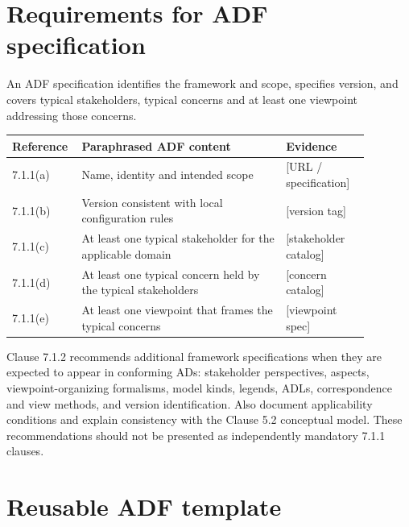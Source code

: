 \documentclass[11pt,letterpaper]{article}
\begin{document}
\section{Requirements for ADF specification}
\begin{Requirement}\FlagReq{} An ADF specification identifies the framework and scope, specifies version, and covers typical stakeholders, typical concerns and at least one viewpoint addressing those concerns. \end{Requirement}
\begin{longtable}{p{0.12\linewidth}p{0.54\linewidth}p{0.22\linewidth}}\toprule\textbf{Reference}&\textbf{Paraphrased ADF content}&\textbf{Evidence}\\\midrule\endhead
7.1.1(a)&Name, identity and intended scope&[URL / specification]\\
7.1.1(b)&Version consistent with local configuration rules&[version tag]\\
7.1.1(c)&At least one typical stakeholder for the applicable domain&[stakeholder catalog]\\
7.1.1(d)&At least one typical concern held by the typical stakeholders&[concern catalog]\\
7.1.1(e)&At least one viewpoint that frames the typical concerns&[viewpoint spec]\\\bottomrule\end{longtable}
\begin{Guidance}Clause 7.1.2 recommends additional framework specifications when they are expected to appear in conforming ADs: stakeholder perspectives, aspects, viewpoint-organizing formalisms, model kinds, legends, ADLs, correspondence and view methods, and version identification. Also document applicability conditions and explain consistency with the Clause 5.2 conceptual model. These recommendations should not be presented as independently mandatory 7.1.1 clauses.\end{Guidance}
\section{Reusable ADF template}
\end{document}
